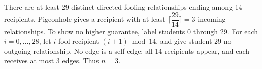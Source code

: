 There are at least 29 distinct directed fooling relationships ending among 14 recipients. Pigeonhole gives a recipient with at least $\lceil\dfrac{29}{14}\rceil=3$ incoming relationships. To show no higher guarantee, label students 0 through 29. For each $i=0,\ldots,28$, let $i$ fool recipient $(i+1)\bmod14$, and give student 29 no outgoing relationship. No edge is a self-edge; all 14 recipients appear, and each receives at most 3 edges. Thus $\boxed n=3$.
